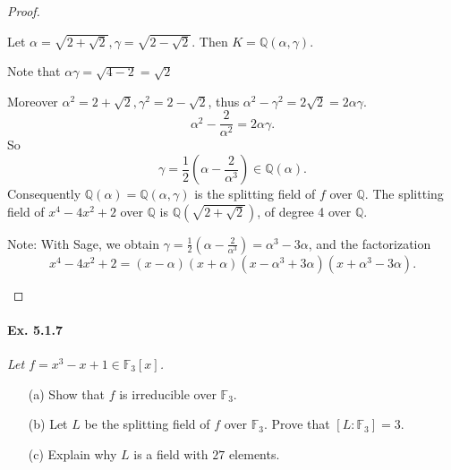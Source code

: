 \documentclass[11pt,a4paper]{article}
\newcommand{\Q}{\mathbb{Q}}
\newcommand{\F}{\mathbb{F}}
\begin{document}
\begin{proof}
\begin{enumerate}
Let $\alpha= \sqrt{2+\sqrt{2}}, \gamma= \sqrt{2-\sqrt{2}}$. Then $K=\Q(\alpha,\gamma)$.

Note that $\alpha \gamma = \sqrt{4-2} = \sqrt{2}$

Moreover $\alpha^2 = 2+\sqrt{2}, \gamma^2 = 2 - \sqrt{2}$, thus $\alpha^2 - \gamma^2 = 2\sqrt{2} = 2 \alpha \gamma$.
$$\alpha^2 - \frac{2}{\alpha^2} = 2 \alpha \gamma.$$
So
$$\gamma = \frac{1}{2}\left( \alpha - \frac{2}{\alpha^3}\right) \in \Q(\alpha).$$
Consequently $\Q(\alpha) = \Q(\alpha,\gamma)$ is the splitting field of $f$ over $\Q$.
The splitting field of $x^4-4x^2+2$ over $\Q$ is $\Q(\sqrt{2+\sqrt{2}})$, of degree 4 over $\Q$.

Note: With Sage, we obtain $\gamma = \frac{1}{2}\left( \alpha - \frac{2}{\alpha^3}\right) = \alpha^3 - 3 \alpha$, and the factorization
$$x^4 - 4 x^2+2 = (x - \alpha)  (x + \alpha)  (x - \alpha^3 + 3\alpha)  (x + \alpha^3 - 3\alpha).$$

\end{enumerate}
\end{proof}

\paragraph{Ex. 5.1.7}

{\it Let $f = x^3-x+1 \in \F_3[x]$.
\begin{enumerate}
\item[(a)] Show that $f$ is irreducible over $\F_3$.
\item[(b)] Let $L$ be the splitting field of $f$ over $\F_3$. Prove that $[L:\F_3] = 3$.
\item[(c)] Explain why $L$ is a field with $27$ elements.
\end{enumerate}
}
\end{document}
